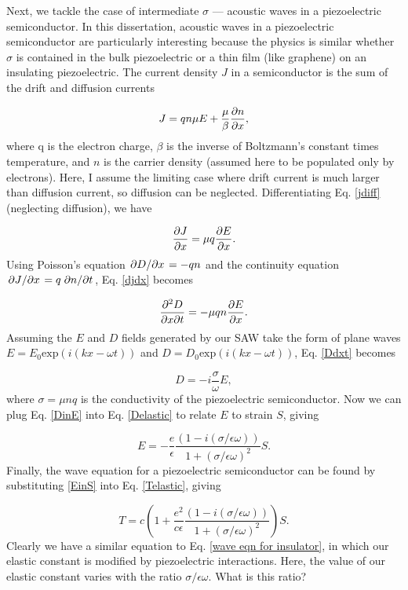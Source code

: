 \documentclass[double,12pt,1in]{beavtex}
\begin{document}
Next, we tackle the case of intermediate $\sigma$ — acoustic waves in a piezoelectric semiconductor. In this dissertation, acoustic waves in a piezoelectric semiconductor are particularly interesting because the physics is similar whether $\sigma$ is contained in the bulk piezoelectric or a thin film (like graphene) on an insulating piezoelectric. The current density $J$ in a semiconductor is the sum of the drift and diffusion currents

\begin{equation}
    J = q n \mu E + \frac{\mu}{\beta} \pdv{n}{x}, \label{jdiff}
\end{equation}
where q is the electron charge, $\beta$ is the inverse of Boltzmann's constant times temperature, and $n$ is the carrier density (assumed here to be populated only by electrons). Here, I assume the limiting case where drift current is much larger than diffusion current, so diffusion can be neglected. Differentiating Eq. \ref{jdiff} (neglecting diffusion), we have

\begin{equation}
    \pdv{J}{x} = \mu q \pdv{E}{x}. \label{djdx}
\end{equation}
Using Poisson's equation $\pdv*{D}{x} = -qn$ and the continuity equation $\pdv*{J}{x} = q \pdv*{n}{t}$, Eq. \ref{djdx} becomes

\begin{equation}
    \pdv{D}{x}{t} = -\mu q n \pdv{E}{x}. \label{Ddxt}
\end{equation}
Assuming the $E$ and $D$ fields generated by our SAW take the form of plane waves $E = E_0 \mathrm{exp}(i(kx - \omega t))$ and $D = D_0 \mathrm{exp}(i(kx - \omega t))$, Eq. \ref{Ddxt} becomes

\begin{equation}
    D = -i\frac{\sigma}{\omega} E, \label{DinE}
\end{equation}
where $\sigma = \mu n q$ is the conductivity of the piezoelectric semiconductor. Now we can plug Eq. \ref{DinE} into Eq. \ref{Delastic} to relate $E$ to strain $S$, giving

\begin{equation}
    E = -\frac{e}{\epsilon}\frac{(1-i(\sigma/\epsilon\omega))}{1+(\sigma/\epsilon\omega)^2}S. \label{EinS}
\end{equation}
Finally, the wave equation for a piezoelectric semiconductor can be found by substituting \ref{EinS} into Eq. \ref{Telastic}, giving

\begin{equation}
    T = c(1 + \frac{e^2}{c\epsilon}\frac{(1-i(\sigma/\epsilon\omega))}{1+(\sigma/\epsilon\omega)^2})S. \label{TSsigma}
\end{equation}
Clearly we have a similar equation to Eq. \ref{wave eqn for insulator}, in which our elastic constant is modified by piezoelectric interactions. Here, the value of our elastic constant varies with the ratio $\sigma/\epsilon\omega$. What is this ratio?
\end{document}
